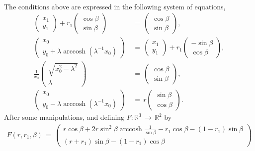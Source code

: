 \documentclass[reqno,makeidx,12pt]{amsart}
\theoremstyle{note}
\theoremstyle{definition}
\begin{document}
{\mbox{}\\\underline{}}
The conditions above are expressed
in the following system of equations, 
\begin{align}
  \begin{pmatrix}x_1\\y_1\end{pmatrix} +
  r_1\begin{pmatrix}\cos\beta\\\sin\beta\end{pmatrix} \,&=\,
  \begin{pmatrix}\cos\beta\\\sin\beta\end{pmatrix}, \label{eq:sys1}\\
  \begin{pmatrix}x_0\\y_0 +\lambda \operatorname{arccosh} (\lambda^{-1}x_0)\end{pmatrix} \,&=\,
  \begin{pmatrix}x_1\\y_1\end{pmatrix} +
  r_1\begin{pmatrix}-\sin\beta\\\cos\beta\end{pmatrix}, \label{eq:sys2}\\
  \frac{1}{x_0}\begin{pmatrix}\sqrt{x_0^2-\lambda^2}\\\lambda
  \end{pmatrix} \,&=\,
  \begin{pmatrix}\cos\beta\\\sin\beta\end{pmatrix}, \label{eq:sys3}\\
  \begin{pmatrix}x_0\\y_0-\lambda\operatorname{arccosh} (\lambda^{-1}x_0)\end{pmatrix} \,&=\,
  r\begin{pmatrix}\sin\beta\\\cos\beta\end{pmatrix}. \label{eq:sys4}
\end{align}
After some manipulations, and defining $F:{\mathbb R}^3\,\to\,{\mathbb R}^2$ by
\begin{gather*}
  F(r,r_1,\beta)\,=\, \begin{pmatrix}
  r\cos\beta + 2r\sin^2\beta\operatorname{arccosh}\frac{1}{\sin\beta}
  -r_1\cos\beta -(1-r_1)\sin\beta\\
  (r + r_1)\sin\beta - (1-r_1)\cos\beta \end{pmatrix}
\end{gather*}
\end{document}
